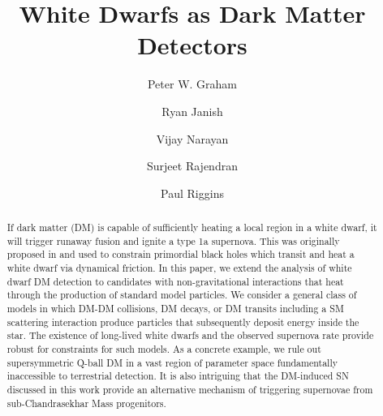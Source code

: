 \documentclass[twocolumn, preprintnumbers,amsmath,amssymb,prd, superscriptaddress]{revtex4}
\begin{document}


\title{White Dwarfs as Dark Matter Detectors}

\author{Peter W. Graham}

\author{Ryan Janish}

\author{Vijay Narayan}

\author{Surjeet Rajendran}

\author{Paul Riggins}

\begin{abstract}

If dark matter (DM) is capable of sufficiently heating a local region in a white dwarf, it will trigger runaway fusion and ignite a type 1a supernova.
This was originally proposed in \cite{Graham:2015apa} and used to constrain primordial black holes which transit and heat a white dwarf via dynamical friction.
In this paper, we extend the analysis of white dwarf DM detection to candidates with non-gravitational interactions that heat through the production of standard model particles.
We consider a general class of models in which DM-DM collisions, DM decays, or DM transits including a SM scattering interaction produce particles that subsequently deposit energy inside the star.
The existence of long-lived white dwarfs and the observed supernova rate provide robust for constraints for such models.
As a concrete example, we rule out supersymmetric Q-ball DM in a vast region of parameter space fundamentally inaccessible to terrestrial detection.
It is also intriguing that the DM-induced SN discussed in this work provide an alternative mechanism of triggering supernovae from sub-Chandrasekhar Mass progenitors.


\end{abstract}
\maketitle
\onecolumngrid
\tableofcontents
\clearpage
\twocolumngrid
\end{document}
